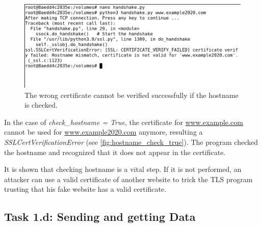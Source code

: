 \begin{figure}
    \centering
    \includegraphics[height=\textheight,width=\textwidth,keepaspectratio]
    {figures/hostname_check_true.png}
    \caption{The wrong certificate cannot be verified successfully if the
    hostname is checked.}
    \label{fig:hostname_check_true}
\end{figure}

In the case of \emph{check\_hostname = True}, the certificate for \url{www.example.com}
cannot be used for \url{www.example2020.com} anymore, resulting a \emph{SSLCertVerificationError}
(see \autoref{fig:hostname_check_true}). The program checked the hostname and recognized
that it does not appear in the certificate.

It is shown that checking hostname is a vital step. If it is not performed, an attacker can
use a valid certificate of another website to trick the TLS program trusting that his fake
website has a valid certificate.


\subsection{Task 1.d: Sending and getting Data}

